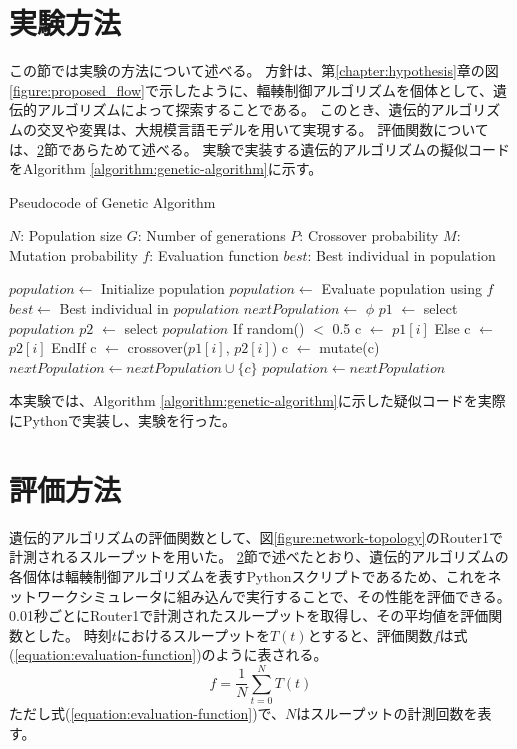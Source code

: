 \documentclass[a4paper,11pt]{jreport}
\newcommand{\figref}[1]{図\ref{#1}}
\newcommand{\chapref}[1]{第\ref{#1}章}
\newcommand{\secref}[1]{\ref{#1}節}
\newcommand{\algorithmref}[1]{Algorithm \ref{#1}}
\newcommand{\equationref}[1]{式(\ref{#1})}
\begin{document}
\section{実験方法}
\label{section:experiment-method}
この節では実験の方法について述べる。
方針は、\chapref{chapter:hypothesis}の\figref{figure:proposed_flow}で示したように、輻輳制御アルゴリズムを個体として、遺伝的アルゴリズムによって探索することである。
このとき、遺伝的アルゴリズムの交叉や変異は、大規模言語モデルを用いて実現する。
評価関数については、\secref{section:evaluation-method}であらためて述べる。
実験で実装する遺伝的アルゴリズムの擬似コードを\algorithmref{algorithm:genetic-algorithm}に示す。
\begin{algorithm}[htbp]
  \caption{Pseudocode of Genetic Algorithm}
  \label{algorithm:genetic-algorithm}
  \begin{algorithmic}[1]
    \Require
      \Statex $N$: Population size
      \Statex $G$: Number of generations
      \Statex $P$: Crossover probability
      \Statex $M$: Mutation probability
      \Statex $f$: Evaluation function
    \Ensure
      \Statex $best$: Best individual in population

    \State $population \gets$ Initialize population
      \State $population \gets$ Evaluate population using $f$
      \State $best \gets$ Best individual in $population$
      \State $nextPopulation \gets$ $\phi$
      \State $p1$ $\gets$ select $population$
      \State $p2$ $\gets$ select $population$
        If {random() $<$ 0.5}
          c $\gets$ $p1[i]$
        Else
          c $\gets$ $p2[i]$
        EndIf
          c $\gets$ crossover($p1[i]$, $p2[i]$)
        \EndIf
          c $\gets$ mutate(c)
        \EndIf
        \State $nextPopulation \gets nextPopulation \cup \{c\}$
      \EndFor
      \State $population \gets nextPopulation$
    \EndFor
  \end{algorithmic}
\end{algorithm}
本実験では、\algorithmref{algorithm:genetic-algorithm}に示した疑似コードを実際にPythonで実装し、実験を行った。

\section{評価方法}
\label{section:evaluation-method}

遺伝的アルゴリズムの評価関数として、\figref{figure:network-topology}のRouter1で計測されるスループットを用いた。
\secref{section:evaluation-method}で述べたとおり、遺伝的アルゴリズムの各個体は輻輳制御アルゴリズムを表すPythonスクリプトであるため、これをネットワークシミュレータに組み込んで実行することで、その性能を評価できる。
0.01秒ごとにRouter1で計測されたスループットを取得し、その平均値を評価関数とした。
時刻$t$におけるスループットを$T(t)$とすると、評価関数$f$は\equationref{equation:evaluation-function}のように表される。
\begin{equation}
  \label{equation:evaluation-function}
  f = \frac{1}{N} \sum_{t=0}^{N} T(t)
\end{equation}
ただし\equationref{equation:evaluation-function}で、$N$はスループットの計測回数を表す。
\end{document}
